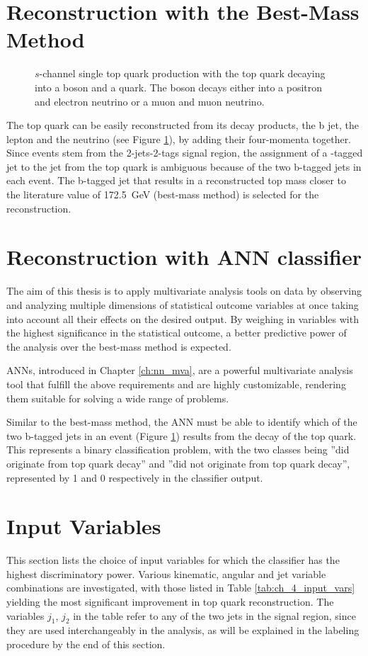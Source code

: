 \section{Reconstruction with the Best-Mass Method}
\label{sec:ch-4-best-mass}
\begin{figure}[h]
    \centering
    
    \caption{$s$-channel single top quark production with the top quark decaying into a \PWplus boson and a \Pbottom quark. The \PWplus boson decays either into a positron and electron neutrino or a muon and muon neutrino.}
    \label{fig:ch_4_single_top_reco}
\end{figure}
The top quark can be easily reconstructed from its decay products, the b jet, the lepton and the neutrino (see Figure \ref{fig:ch_4_single_top_reco}), by adding their four-momenta together. Since events stem from the 2-jets-2-tags signal region, the assignment of a \Pbottom-tagged jet to the \Pbottom jet from the top quark is ambiguous because of the two b-tagged jets in each event. The b-tagged jet that results in a reconstructed top mass closer to the literature value of \SI{172.5}{GeV} (best-mass method) is selected for the reconstruction.

\section{Reconstruction with ANN classifier}
The aim of this thesis is to apply multivariate analysis tools on data by observing and analyzing multiple dimensions of statistical outcome variables at once taking into account all their effects on the desired output. By weighing in variables with the highest significance in the statistical outcome, a better predictive power of the analysis over the best-mass method is expected.

ANNs, introduced in Chapter \ref{ch:nn_mva}, are a powerful multivariate analysis tool that fulfill the above requirements and are highly customizable, rendering them suitable for solving a wide range of problems.

Similar to the best-mass method, the ANN must be able to identify which of the two b-tagged jets in an event (Figure \ref{fig:ch_4_single_top_reco}) results from the decay of the top quark. This represents a binary classification problem, with the two classes being ''did originate from top quark decay'' and ''did not originate from top quark decay'', represented by 1 and 0 respectively in the classifier output.

\section{Input Variables}
\label{sec:ch-4-input-vars}
This section lists the choice of input variables for which the classifier has the highest discriminatory power. Various kinematic, angular and jet variable combinations are investigated, with those listed in Table \ref{tab:ch_4_input_vars} yielding the most significant improvement in top quark reconstruction. The variables $j_1$, $j_2$ in the table refer to any of the two jets in the signal region, since they are used interchangeably in the analysis, as will be explained in the labeling procedure by the end of this section.

